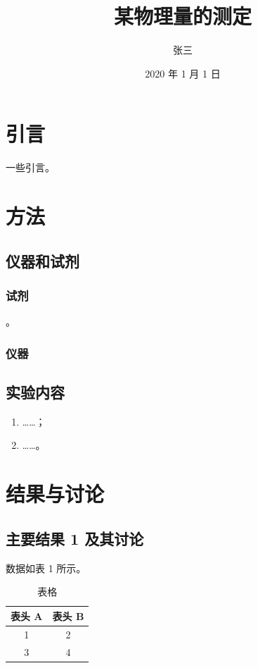 \documentclass{pkupcl}
\title{某物理量的测定}
\author{张三}
\date{2020 年 1 月 1 日}
\begin{document}
\makecover
\section{引言}

一些引言。

\section{方法}

\subsection{仪器和试剂}

\subsubsection{试剂}

。

\subsubsection{仪器}

\subsection{实验内容}

\begin{enumerate}
	\item ……；
	\item ……。
\end{enumerate}

\section{结果与讨论}

\subsection{主要结果 1 及其讨论}

数据如表 1 所示。

\begin{table}[!ht]
\centering
\caption{表格}	
\begin{tabular}{cc}
\toprule
表头 A & 表头 B \\ \midrule
1     & 2      \\
3     & 4      \\ \bottomrule
\end{tabular}
\end{table}
\end{document}
